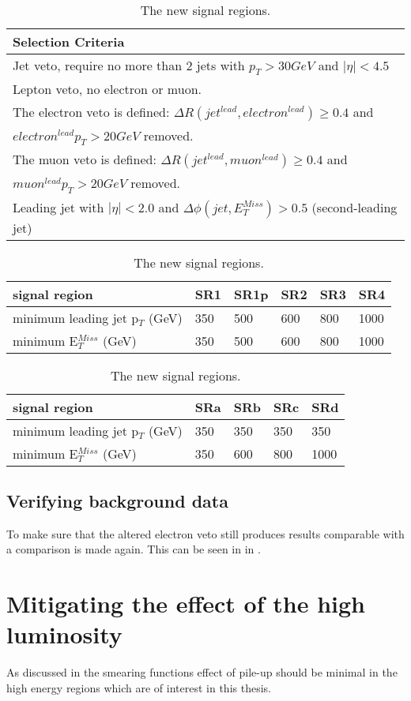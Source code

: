 \begin{table}[h]
\begin{center}
\begin{tabular}{l}
\hline
Selection Criteria \\ \hline
Jet veto, require no more than 2 jets with $p_T > 30 GeV$ and $|\eta| < 4.5$ \\
Lepton veto, no electron or muon. \\
The electron veto is defined: $\Delta R (jet^{lead},electron^{lead})\geq 0.4$ and \\
$electron^{lead} p_T>20 GeV$ removed.\\
The muon veto is defined: $\Delta R (jet^{lead},muon^{lead})\geq 0.4$ and \\
$muon^{lead} p_T>20 GeV$ removed.\\
Leading jet with $|\eta| < 2.0$ and $\Delta \phi (jet, E_T^{Miss})>0.5$ (second-leading jet) \\ 
\end{tabular}
\begin{tabular}{l l l l l l}
\hline
signal region & SR1 & SR1p & SR2 & SR3 & SR4 \\ \hline
minimum leading jet p$_T$ (GeV) & 350 &500& 600 & 800 & 1000 \\
minimum E$^{Miss}_T$ (GeV) & 350&500 & 600 & 800 & 1000 \\
\end{tabular}
\begin{tabular}{l l l l l} \hline
signal region & SRa &  SRb & SRc & SRd \\ \hline
minimum leading jet p$_T$ (GeV) & 350 & 350 & 350 & 350 \\
minimum E$^{Miss}_T$ (GeV) & 350 & 600 & 800 & 1000 \\ \hline
\end{tabular}
\caption{The new signal regions.}
\label{tab:newsr}
\end{center}
\end{table}

\subsection{Verifying background data}
To make sure that the altered electron veto still produces results comparable with \citep{ATLAS-CONF-2012-147} a comparison is made again. This can be seen in  in .

\section{Mitigating the effect of the high luminosity}
As discussed in  the smearing functions effect of pile-up should be minimal in the high energy regions which are of interest in this thesis. 

